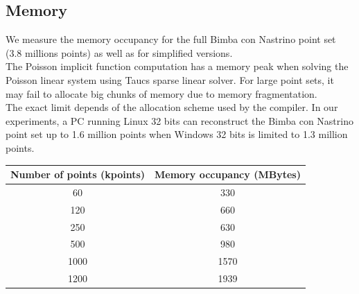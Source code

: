 \subsection{Memory}

We measure the memory occupancy for the full Bimba con Nastrino point set (3.8 millions points) as well as for simplified versions.\\
The Poisson implicit function computation has a memory peak when solving the Poisson linear system using {\sc Taucs} sparse linear solver. For large point sets, it may fail to allocate big chunks of memory due to memory fragmentation.\\
The exact limit depends of the allocation scheme used by the compiler. In our experiments, a PC running Linux 32 bits can reconstruct the Bimba con Nastrino point set up to 1.6 million points when Windows 32 bits is limited to 1.3 million points.\\

\begin{tabular}{|c|c|}
  \hline
  Number of points (kpoints) & Memory occupancy (MBytes) \\
  \hline
  60                         & 330 \\
  120                        & 660 \\
  250                        & 630 \\
  500                        & 980 \\
  1000                       & 1570 \\
  1200                       & 1939 \\
  \hline
\end{tabular}

